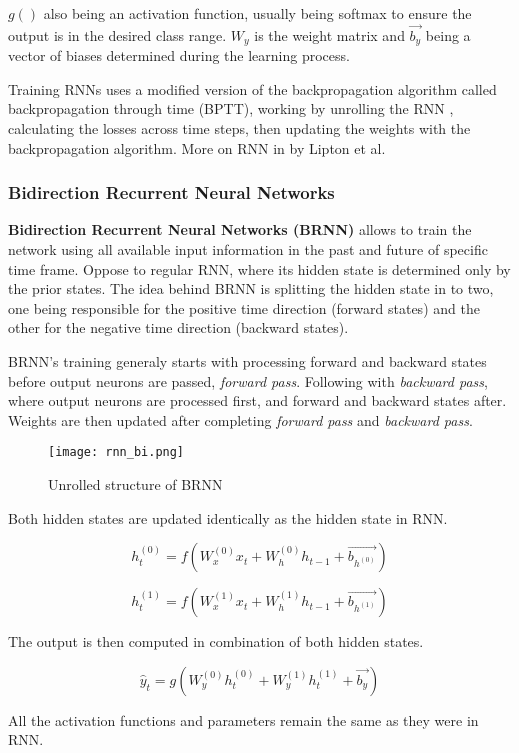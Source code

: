$g()$ also being an activation function, usually being softmax to ensure the output is in the desired class range. $W_y$ is the weight matrix and $\vec{b_y}$ being a vector of biases determined during the learning process.

Training RNNs uses a modified version of the backpropagation algorithm called backpropagation through time (BPTT), working by unrolling the RNN \cite{Goodfellow-et-al-2016}, calculating the losses across time steps, then updating the weights with the backpropagation algorithm. More on RNN in \cite{lipton2015critical} by Lipton et al.


\subsubsection{Bidirection Recurrent Neural Networks}

\textbf{Bidirection Recurrent Neural Networks (BRNN)} allows to train the network using all available input information in the past and future of specific time frame. Oppose to regular RNN, where its hidden state is determined only by the prior states. The idea behind BRNN is splitting the hidden state in to two, one being responsible for the positive time direction (forward states) and the other for the negative time direction (backward states). 

BRNN's training generaly starts with processing forward and backward states before output neurons are passed, \textit{forward pass}. Following with \textit{backward pass}, where output neurons are processed first, and forward and backward states after. Weights are then updated after completing \textit{forward pass} and \textit{backward pass}.\cite{schusterbdrnn}

\begin{figure}[h]
	\centering
    \texttt{[image: rnn\_bi.png]}
	\caption{Unrolled structure of BRNN \cite{matous}}
	\label{fig:brnn}
\end{figure}


Both hidden states are updated identically as the hidden state in RNN.

\begin{equation}
    {h_t^{(0)} = f(W_{x}^{(0)}x_t + W_{h}^{(0)}h_{t-1}+\vec{b_{h^{(0)}}})}
\end{equation}

\begin{equation}
    {h_t^{(1)} = f(W_{x}^{(1)}x_t + W_{h}^{(1)}h_{t-1}+\vec{b_{h^{(1)}}})}
\end{equation}

The output is then computed in combination of both hidden states.

\begin{equation}
    {\hat{y}_t = g(W_{y}^{(0)}h_t^{(0)} + W_{y}^{(1)}h_t^{(1)} + \vec{b_y})}
\end{equation}

All the activation functions and parameters remain the same as they were in RNN. 

